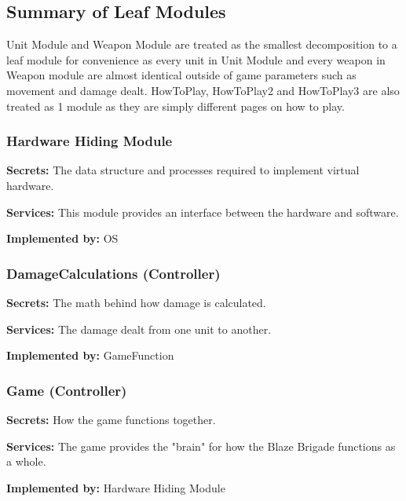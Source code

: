 \documentclass{article}
\begin{document}
\subsection{Summary of Leaf Modules}

Unit Module and Weapon Module are treated as the smallest decomposition to a leaf module for convenience as every unit in Unit Module and every weapon in Weapon module are almost identical outside of game parameters such as movement and damage dealt. HowToPlay, HowToPlay2 and HowToPlay3 are also treated as 1 module as they are simply different pages on how to play. 

\subsubsection{Hardware Hiding Module}
\begin{description}[leftmargin=0.2cm]
    \item \textbf{Secrets:} The data structure and processes required to implement virtual hardware.
    \item \textbf{Services:} This module provides an interface between the hardware and software.
    \item \textbf{Implemented by:} OS
\end{description}

\subsubsection{DamageCalculations (Controller)}
\begin{description}[leftmargin=0.2cm]
    \item \textbf{Secrets:} The math behind how damage is calculated.
    \item \textbf{Services:} The damage dealt from one unit to another.
    \item \textbf{Implemented by:} GameFunction
\end{description}

\subsubsection{Game (Controller)}
\begin{description}[leftmargin=0.2cm]
    \item \textbf{Secrets:} How the game functions together.
    \item \textbf{Services:} The game provides the "brain" for how the Blaze Brigade functions as a whole.
    \item \textbf{Implemented by:} Hardware Hiding Module
\end{description}
\end{document}
